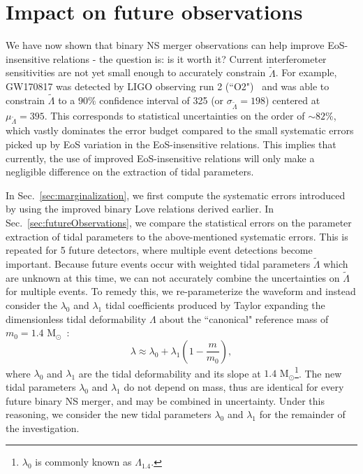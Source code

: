 \documentclass[prd,twocolumn,nofootinbib,superscriptaddress,amsmath,amssymb]{revtex4-1}
\begin{document}
\section{Impact on future observations}\label{sec:observations}

We have now shown that binary NS merger observations can help improve EoS-insensitive relations - the question is: is it worth it?
Current interferometer sensitivities are not yet small enough to accurately constrain $\tilde{\Lambda}$.
For example, GW170817 was detected by LIGO observing run 2 (``O2")~\cite{aLIGO} and was able to constrain $\tilde{\Lambda}$ to a $90\%$ confidence interval of 325 (or $\sigma_{\tilde{\Lambda}}=198$) centered at $\mu_{\tilde{\Lambda}}=395$.
This corresponds to statistical uncertainties on the order of $\sim 82\%$, which vastly dominates the error budget compared to the small systematic errors picked up by EoS variation in the EoS-insensitive relations.
This implies that currently, the use of improved EoS-insensitive relations will only make a negligible difference on the extraction of tidal parameters.

In Sec.~\ref{sec:marginalization}, we first compute the systematic errors introduced by using the improved binary Love relations derived earlier.
In Sec.~\ref{sec:futureObservations}, we compare the statistical errors on the parameter extraction of tidal parameters to the above-mentioned systematic errors.
This is repeated for 5 future detectors, where multiple event detections become important.
Because future events occur with weighted tidal parameters $\tilde\Lambda$ which are unknown at this time, we can not accurately combine the uncertainties on $\tilde\Lambda$ for multiple events.
To remedy this, we re-parameterize the waveform and instead consider the $\lambda_0$ and $\lambda_1$ tidal coefficients produced by Taylor expanding the dimensionless tidal deformability $\Lambda$ about the ``canonical" reference mass of $m_0=1.4\text{ M}_{\odot}$~\cite{delPozzo:TaylorTidal,Yagi:binLove}:
\begin{equation}
\lambda \approx \lambda_0 + \lambda_1 (1-\frac{m}{m_0}),
\end{equation}
where $\lambda_0$ and $\lambda_1$ are the tidal deformability and its slope at $1.4 \text{ M}_{\odot}$\footnote{$\lambda_0$ is commonly known as $\Lambda_{1.4}$.}. 
The new tidal parameters $\lambda_0$ and $\lambda_1$ do not depend on mass, thus are identical for every future binary NS merger, and may be combined in uncertainty.
Under this reasoning, we consider the new tidal parameters $\lambda_0$ and $\lambda_1$ for the remainder of the investigation.
\end{document}
